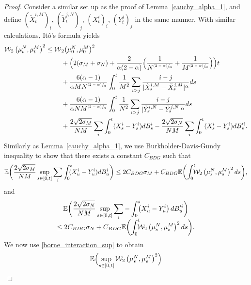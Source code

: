\documentclass[JEP,XML,SOM,Unicode,published]{cedram}
\newcommand{\psfrac}[2]{\sfrac{(#1)}{#2}}
\theoremstyle{plain}
\theoremstyle{definition}
\begin{document}
\begin{proof}
Consider a similar set up as the proof of Lemma~\ref{cauchy_alpha_1}, and define $(\tilde{X}^{i,M}_t)_i$, $(\tilde{Y}^{j,N}_t)_j$, $(X^{i}_t)_i$, $(Y^{j}_t)_j$ in the same manner. With similar calculations, Itô's formula yields\vspace*{-5pt}
\begin{align*}
\mathcal{W}_2\left(\mu_t^N,\mu_t^M\right)^2\leq \mathcal{W}&_2\bigl(\mu_0^N,\mu_0^M\bigr)^2\\
&+\Bigl(2(\sigma_M+\sigma_N)+\frac{2}{\alpha(2-\alpha)}\Bigl(\frac{1}{N^{\psfrac{2-\alpha}{\alpha}}}+\frac{1}{M^{\psfrac{2-\alpha}{\alpha}}}\Bigr)\Bigr)t\\
&+\frac{6(\alpha-1)}{\alpha MN^{\psfrac{2-\alpha}{\alpha}}}\int_{0}^t\frac{1}{M^2}\sum_{i>j}\frac{i-j}{|\tilde{X}^{i,M}_s-\tilde{X}^{j,M}_s|^{\alpha}}ds\\
&+\frac{6(\alpha-1)}{\alpha NM^{\psfrac{2-\alpha}{\alpha}}}\int_{0}^t\frac{1}{N^2}\sum_{i>j}\frac{i-j}{|\tilde{Y}^{i,N}_s-\tilde{Y}^{j,N}_s|^{\alpha}}ds\\
&+\frac{2\sqrt{2\sigma_M}}{NM}\sum_i\int_0^t(X^i_s-Y^i_s)dB^i_s-\frac{2\sqrt{2\sigma_N}}{NM}\sum_i\int_0^t(X^i_s-Y^i_s)dB'^i_s.
\end{align*}
Similarly as Lemma~\ref{cauchy_alpha_1}, we use Burkholder-Davis-Gundy inequality to show that there exists a constant $C_{BDG}$ such that\vspace*{-3pt}
\[
\mathbb{E}\biggl(\frac{2\sqrt{2\sigma_M}}{NM}\sup_{s\in[0,t]}\sum_i\int_0^s\hspace*{-2mm}(X^i_u-Y^i_u)dB^{i}_u\biggr)\\
\leq2C_{BDG}\sigma_M+C_{BDG}\mathbb{E}\biggl(\int_0^t\hspace*{-2mm}\mathcal{W}_2\left(\mu_s^N,\mu_s^M\right)^2ds\biggr),
\]
and\vspace*{-5pt}
\begin{multline*}
\mathbb{E}\biggl(\frac{2\sqrt{2\sigma_N}}{NM}\sup_{s\in[0,t]}\sum_i-\int_0^s\hspace*{-2mm}\left(X^i_u-Y^i_u\right)dB'^{i}_u\biggr)\\[-5pt]
\leq2C_{BDG}\sigma_N+C_{BDG}\mathbb{E}\biggl(\int_0^t\hspace*{-2mm}\mathcal{W}_2\left(\mu_s^N,\mu_s^M\right)^2ds\biggr).
\end{multline*}
We now use \eqref{borne_interaction_sup} to obtain\vspace*{-3pt}
\begin{align*}
\mathbb{E}&\Bigl(\sup_{s\in[0,t]}\mathcal{W}_2\left(\mu_s^N,\mu_s^M\right)^2\Bigr)\\

\end{align*}
\end{proof}
\end{document}
